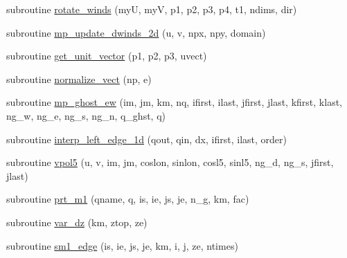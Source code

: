 \begin{DoxyCompactItemize}
\item 
subroutine \hyperlink{classtest__cases__mod_a59a3bb46b35dad4617aba090560961a9}{rotate\-\_\-winds} (my\-U, my\-V, p1, p2, p3, p4, t1, ndims, dir)
\item 
subroutine \hyperlink{classtest__cases__mod_a56aabda863218f45dc775170ceba5aa2}{mp\-\_\-update\-\_\-dwinds\-\_\-2d} (u, v, npx, npy, domain)
\item 
subroutine \hyperlink{classtest__cases__mod_a062259e5b5a7538878395c3c36f93812}{get\-\_\-unit\-\_\-vector} (p1, p2, p3, uvect)
\item 
subroutine \hyperlink{classtest__cases__mod_ab75c7874346b38287cfdd0d8b7203efe}{normalize\-\_\-vect} (np, e)
\item 
subroutine \hyperlink{classtest__cases__mod_af0c5eed92a1687ee952699be641c348e}{mp\-\_\-ghost\-\_\-ew} (im, jm, km, nq, ifirst, ilast, jfirst, jlast, kfirst, klast, ng\-\_\-w, ng\-\_\-e, ng\-\_\-s, ng\-\_\-n, q\-\_\-ghst, q)
\item 
subroutine \hyperlink{classtest__cases__mod_a415516dbd80cfd3e86430cd0c179f40e}{interp\-\_\-left\-\_\-edge\-\_\-1d} (qout, qin, dx, ifirst, ilast, order)
\item 
subroutine \hyperlink{classtest__cases__mod_a098fd2aa751bcc0f29a4964e8d22c8c9}{vpol5} (u, v, im, jm, coslon, sinlon, cosl5, sinl5, ng\-\_\-d, ng\-\_\-s, jfirst, jlast)
\item 
subroutine \hyperlink{classtest__cases__mod_a7247ffa5b8fb6b80fe65789070118683}{prt\-\_\-m1} (qname, q, is, ie, js, je, n\-\_\-g, km, fac)
\item 
subroutine \hyperlink{classtest__cases__mod_a2a67940979b1f8017967bb8ce9a264be}{var\-\_\-dz} (km, ztop, ze)
\item 
subroutine \hyperlink{classtest__cases__mod_ac4ef2aa50a930be13ee7d7750b2586fc}{sm1\-\_\-edge} (is, ie, js, je, km, i, j, ze, ntimes)
\end{DoxyCompactItemize}
